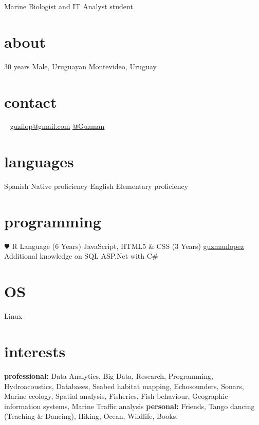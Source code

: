 \documentclass[]{friggeri-cv} %
\begin{document}
{Marine Biologist and IT Analyst student} %


\begin{aside} %
	
\section{about}
30 years
Male, Uruguayan	
{\color{brown} \faHome{}} Montevideo, Uruguay
\section{contact}~
{\color{green} \faEnvelope{}} \href{mailto:guzilop@gmail.com}{guzilop@gmail.com}
{\color{blue} \faSend{}} \href{https://telegram.me/Guzman}{@Guzman}
\section{languages}
Spanish Native proficiency
English Elementary proficiency
\section{programming}
{\color{red} $\varheartsuit$} R Language (6 Years)
JavaScript, HTML5 \& CSS (3 Years)
\faGithubAlt{} \href{https://github.com/guzmanlopez}{guzmanlopez}
~
Additional knowledge on
SQL
ASP.Net with C\#
\section{OS}
{\color{gray}\FA \faLinux} Linux
\end{aside}

\section{interests}

\textbf{professional:} Data Analytics, Big Data, Research, Programming, Hydroacoustics, Databases, Seabed habitat mapping, Echosounders, Sonars, Marine ecology, Spatial analysis, Fisheries, Fish behaviour, Geographic information systems, Marine Traffic analysis \textbf{personal:} Friends, Tango dancing (Teaching & Dancing), Hiking, Ocean, Wildlife, Books.\\
\end{document}
